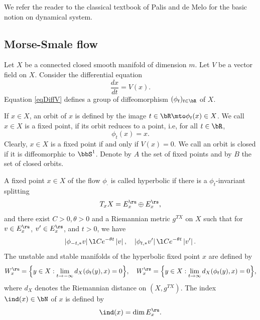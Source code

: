 We refer the reader to the classical textbook of Palis and de
Melo \cite{Palis82} for the basic notion on dynamical system.

\subsection{Morse-Smale flow}\label{sMS}
Let $X$ be a connected closed smooth manifold of dimension $m$. Let $V$ be a
vector field on $X$. Consider the differential equation
\begin{equation}\label{eqDiffV}
\frac{dx}{dt}=V(x).
\end{equation}
Equation \eqref{eqDiffV} defines a group of diffeomorphism
$(\phi_{t})_{t\in \bR}$ of $X$.

If $x\in X$, an orbit of $x$ is defined by the image $t\in \bR\mto
\phi_{t}(x)\in X$. We call $x\in X$ is a fixed point, if its orbit reduces to a point, i.e, for all $t\in \bR$,
\begin{equation*}
\phi_{t}(x)=x.
\end{equation*}
Clearly, $x\in X$ is a fixed point if and only if $V(x)=0$.
We call an orbit is closed if it is diffeomorphic to $\bbS^{1}$.
Denote by $A$ the set of fixed points and by $B$ the set of closed orbits.

\begin{defin}
A fixed point $x\in X$ of the flow $\phi_{\cdot}$ is called
hyperbolic if there is a $\phi_{t}$-invariant splitting\vspace*{-3pt}
\begin{equation*}
T_{x}X= E^{\ru}_{x}\oplus E^{\rs}_{x},
\end{equation*}
and there exist $C>0,\theta>0$ and a Riemannian metric $g^{TX}$ on $X$
such that for $v\in E^{\ru}_{x}$, $v'\in E^{\rs}_{x}$, and $t>0$, we have\vspace*{-3pt}
\begin{equation*}\label{eqMS}
\left|\phi_{- t,*}v\right|\l
Ce^{-\theta t}\left|v\right|,\quad \left|\phi_{ t,*}v'\right|\l
Ce^{-\theta t}\left|v'\right|.
\end{equation*}
The unstable and stable manifolds of the hyperbolic fixed point $x$ are defined by
\begin{equation*}
W^{\ru}_{x}=\Big\{y\in X: \lim_{t\to -
\infty}d_{X}(\phi_{t}(y),x)=0\Big\},\quad W^{\rs}_{x}= \Big\{y\in X: \lim_{t\to
\infty}d_X(\phi_{t}(y),x)=0 \Big\},
\end{equation*}
where $d_{X}$ denotes the Riemannian distance on $(X,g^{TX})$. The index $\ind(x)\in \bN$ of $x$ is defined by\vspace*{-3pt}
\begin{equation}\label{eqindxEu}
\ind(x)=\dim E^{\ru}_{x}.
\end{equation}
\end{defin}

